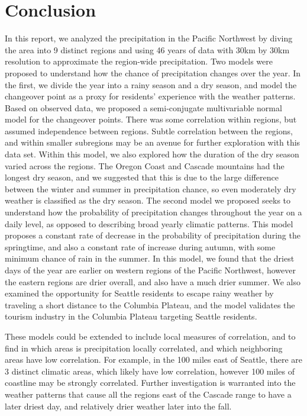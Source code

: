 \documentclass{article}
\begin{document}
\section{Conclusion}

In this report, we analyzed the precipitation in the Pacific Northwest by diving the area into 9 distinct regions and using 46 years of data with 30km by 30km resolution to approximate the region-wide precipitation.
Two models were proposed to understand how the chance of precipitation changes over the year. In the first, we divide the year into a rainy season and a dry season, and model the changeover point as a proxy for residents' experience with the weather patterns. 
Based on observed data, we proposed a semi-conjugate multivariable normal model for the changeover points. There was some correlation within regions, but assumed independence between regions. Subtle correlation between the regions, and within smaller subregions may be an avenue for further exploration with this data set.
Within this model, we also explored how the duration of the dry season varied across the regions. The Oregon Coast and Cascade mountains had the longest dry season, and we suggested that this is due to the large difference between the winter and summer in precipitation chance, so even moderately dry weather is classified as the dry season. 
The second model we proposed seeks to understand how the probability of precipitation changes throughout the year on a daily level, as opposed to describing broad yearly climatic patterns. This model proposes a constant rate of decrease in the probability of precipitation during the springtime, and also a constant rate of increase during autumn, with some minimum chance of rain in the summer.
In this model, we found that the driest days of the year are earlier on western regions of the Pacific Northwest, however the eastern regions are drier overall, and also have a much drier summer. We also examined the opportunity for Seattle residents to escape rainy weather by traveling a short distance to the Columbia Plateau, and the model validates the tourism industry in the Columbia Plateau targeting Seattle residents. 

These models could be extended to include local measures of correlation, and to find in which areas is precipitation locally correlated, and which neighboring areas have low correlation. For example, in the 100 miles east of Seattle, there are 3 distinct climatic areas, which likely have low correlation, however 100 miles of coastline may be strongly correlated.
Further investigation is warranted into the weather patterns that cause all the regions east of the Cascade range to have a later driest day, and relatively drier weather later into the fall.




 
\end{document}
